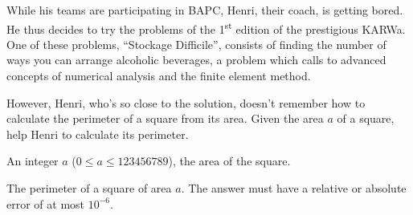 \problemname{\problemyamlname}


\newcommand{\maxa}{123456789}

While his teams are participating in BAPC, Henri, their coach, is getting bored.
He thus decides to try the problems of the 1\textsuperscript{st} edition of the prestigious KARWa.
One of these problems, ``Stockage Difficile'', consists of finding the number of ways you can arrange alcoholic beverages, a problem which calls to advanced concepts of numerical analysis and the finite element method.

However, Henri, who's so close to the solution, doesn't remember how to calculate the perimeter of a square from its area.
Given the area $a$ of a square, help Henri to calculate its perimeter.

\begin{Input}
	An integer $a$ ($0 \le a \le \maxa$), the area of the square.
\end{Input}

\begin{Output}
	The perimeter of a square of area $a$.
	The answer must have a relative or absolute error of at most $10^{-6}$.
\end{Output}
